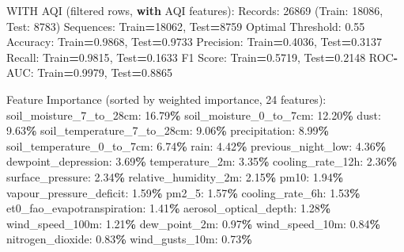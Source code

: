 \documentclass[
  letterpaper,
  DIV=11,
  numbers=noendperiod]{scrartcl}
\newenvironment{Shaded}{\begin{snugshade}}{\end{snugshade}}
\newcommand{\BuiltInTok}[1]{#1}
\newcommand{\ControlFlowTok}[1]{\textcolor[rgb]{0.13,0.29,0.53}{\textbf{#1}}}
\newcommand{\DecValTok}[1]{\textcolor[rgb]{0.00,0.00,0.81}{#1}}
\newcommand{\FloatTok}[1]{\textcolor[rgb]{0.00,0.00,0.81}{#1}}
\newcommand{\NormalTok}[1]{#1}
\newcommand{\OperatorTok}[1]{\textcolor[rgb]{0.81,0.36,0.00}{\textbf{#1}}}
\begin{document}
\begin{Shaded}
\begin{Highlighting}[]
\NormalTok{WITH AQI (filtered rows, }\ControlFlowTok{with}\NormalTok{ AQI features):}
\NormalTok{  Records: }\DecValTok{26869}\NormalTok{ (Train: }\DecValTok{18086}\NormalTok{, Test: }\DecValTok{8783}\NormalTok{)}
\NormalTok{  Sequences: Train}\OperatorTok{=}\DecValTok{18062}\NormalTok{, Test}\OperatorTok{=}\DecValTok{8759}
\NormalTok{  Optimal Threshold: }\FloatTok{0.55}
\NormalTok{  Accuracy: Train}\OperatorTok{=}\FloatTok{0.9868}\NormalTok{, Test}\OperatorTok{=}\FloatTok{0.9733}
\NormalTok{  Precision: Train}\OperatorTok{=}\FloatTok{0.4036}\NormalTok{, Test}\OperatorTok{=}\FloatTok{0.3137}
\NormalTok{  Recall: Train}\OperatorTok{=}\FloatTok{0.9815}\NormalTok{, Test}\OperatorTok{=}\FloatTok{0.1633}
\NormalTok{  F1 Score: Train}\OperatorTok{=}\FloatTok{0.5719}\NormalTok{, Test}\OperatorTok{=}\FloatTok{0.2148}
\NormalTok{  ROC}\OperatorTok{{-}}\NormalTok{AUC: Train}\OperatorTok{=}\FloatTok{0.9979}\NormalTok{, Test}\OperatorTok{=}\FloatTok{0.8865}

\NormalTok{  Feature Importance (}\BuiltInTok{sorted}\NormalTok{ by weighted importance, }\DecValTok{24}\NormalTok{ features):}
\NormalTok{    soil\_moisture\_7\_to\_28cm: }\FloatTok{16.79}\OperatorTok{\%}
\NormalTok{    soil\_moisture\_0\_to\_7cm: }\FloatTok{12.20}\OperatorTok{\%}
\NormalTok{    dust: }\FloatTok{9.63}\OperatorTok{\%}
\NormalTok{    soil\_temperature\_7\_to\_28cm: }\FloatTok{9.06}\OperatorTok{\%}
\NormalTok{    precipitation: }\FloatTok{8.99}\OperatorTok{\%}
\NormalTok{    soil\_temperature\_0\_to\_7cm: }\FloatTok{6.74}\OperatorTok{\%}
\NormalTok{    rain: }\FloatTok{4.42}\OperatorTok{\%}
\NormalTok{    previous\_night\_low: }\FloatTok{4.36}\OperatorTok{\%}
\NormalTok{    dewpoint\_depression: }\FloatTok{3.69}\OperatorTok{\%}
\NormalTok{    temperature\_2m: }\FloatTok{3.35}\OperatorTok{\%}
\NormalTok{    cooling\_rate\_12h: }\FloatTok{2.36}\OperatorTok{\%}
\NormalTok{    surface\_pressure: }\FloatTok{2.34}\OperatorTok{\%}
\NormalTok{    relative\_humidity\_2m: }\FloatTok{2.15}\OperatorTok{\%}
\NormalTok{    pm10: }\FloatTok{1.94}\OperatorTok{\%}
\NormalTok{    vapour\_pressure\_deficit: }\FloatTok{1.59}\OperatorTok{\%}
\NormalTok{    pm2\_5: }\FloatTok{1.57}\OperatorTok{\%}
\NormalTok{    cooling\_rate\_6h: }\FloatTok{1.53}\OperatorTok{\%}
\NormalTok{    et0\_fao\_evapotranspiration: }\FloatTok{1.41}\OperatorTok{\%}
\NormalTok{    aerosol\_optical\_depth: }\FloatTok{1.28}\OperatorTok{\%}
\NormalTok{    wind\_speed\_100m: }\FloatTok{1.21}\OperatorTok{\%}
\NormalTok{    dew\_point\_2m: }\FloatTok{0.97}\OperatorTok{\%}
\NormalTok{    wind\_speed\_10m: }\FloatTok{0.84}\OperatorTok{\%}
\NormalTok{    nitrogen\_dioxide: }\FloatTok{0.83}\OperatorTok{\%}
\NormalTok{    wind\_gusts\_10m: }\FloatTok{0.73}\OperatorTok{\%}


\end{Highlighting}
\end{Shaded}
\end{document}
